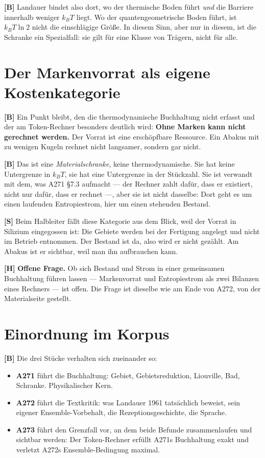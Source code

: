 \textbf{[B]} Landauer bindet also dort, wo der thermische Boden führt \emph{und} die
Barriere innerhalb weniger $k_BT$ liegt. Wo der quantengeometrische Boden führt,
ist $k_BT\ln 2$ nicht die einschlägige Größe. In diesem Sinn, aber nur in diesem,
ist die Schranke ein Spezialfall: sie gilt für eine Klasse von Trägern, nicht für
alle.

\section{Der Markenvorrat als eigene Kostenkategorie}

\textbf{[B]} Ein Punkt bleibt, den die thermodynamische Buchhaltung nicht erfasst und der
am Token-Rechner besonders deutlich wird: \textbf{Ohne Marken kann nicht gerechnet
werden.} Der Vorrat ist eine erschöpfbare Ressource. Ein Abakus mit zu wenigen
Kugeln rechnet nicht langsamer, sondern gar nicht.

\textbf{[B]} Das ist eine \emph{Materialschranke}, keine thermodynamische. Sie hat keine
Untergrenze in $k_BT$, sie hat eine Untergrenze in der Stückzahl. Sie ist
verwandt mit dem, was A271 §7.3 aufmacht --- der Rechner zahlt dafür, dass er
existiert, nicht nur dafür, dass er rechnet ---, aber sie ist nicht dasselbe: Dort
geht es um einen laufenden Entropiestrom, hier um einen stehenden Bestand.

\textbf{[S]} Beim Halbleiter fällt diese Kategorie aus dem Blick, weil der Vorrat in
Silizium eingegossen ist: Die Gebiete werden bei der Fertigung angelegt und nicht
im Betrieb entnommen. Der Bestand ist da, also wird er nicht gezählt. Am Abakus
ist er sichtbar, weil man ihn aufbrauchen kann.

\textbf{[H]} \textbf{Offene Frage.} Ob sich Bestand und Strom in einer gemeinsamen
Buchhaltung führen lassen --- Marken\-vorrat und Entropiestrom als zwei Bilanzen
eines Rechners --- ist offen. Die Frage ist dieselbe wie am Ende von A272, von
der Materialseite gestellt.

\section{Einordnung im Korpus}

\textbf{[B]} Die drei Stücke verhalten sich zueinander so:

\begin{itemize}[leftmargin=1.4em,itemsep=0.3em]
  \item \textbf{A271} führt die Buchhaltung: Gebiet, Gebietsreduktion, Liouville,
        Bad, Schranke. Physikalischer Kern.
  \item \textbf{A272} führt die Textkritik: was Landauer 1961 tatsächlich beweist,
        sein eigener Ensemble-Vorbehalt, die Rezeptionsgeschichte, die Sprache.
  \item \textbf{A273} führt den Grenzfall vor, an dem beide Befunde zusammenlaufen
        und sichtbar werden: Der Token-Rechner erfüllt A271s Buchhaltung exakt und
        verletzt A272s Ensemble-Bedingung maximal.
\end{itemize}

